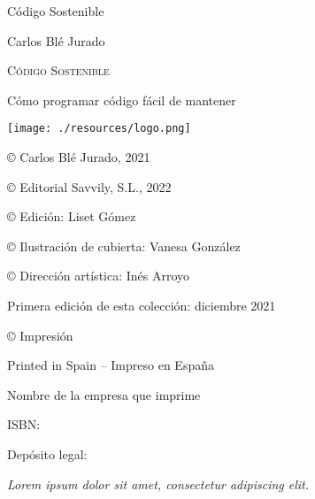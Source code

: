 \documentclass[10pt]{article}
\begin{document}
\newpage\phantom{blabla}\thispagestyle{empty}
\newpage\phantom{blabla}\thispagestyle{empty}
\newpage\phantom{blabla}\thispagestyle{empty}

\begin{titlepage}
  {\large\phantom{blabla} \par}
  \vspace{1cm}
  {\huge\centering Código Sostenible \par}
\end{titlepage}

\newpage\phantom{blabla}\thispagestyle{empty}

\begin{titlepage}\thispagestyle{empty}
  {\large\centering Carlos Blé Jurado \par}
  \vspace{1cm}
  {\scshape\Huge\centering Código Sostenible \par}
  \vspace{0.5cm}
  {\normalsize\centering Cómo programar código fácil de mantener \par}
  \vspace{6.5cm}
  \begin{center}
    {\texttt{[image: ./resources/logo.png]}}
  \end{center}
\end{titlepage}

\begin{titlepage}\thispagestyle{empty}
  \vspace*{\fill}
  {\normalsize © Carlos Blé Jurado, 2021 \par}
  {\normalsize © Editorial Savvily, S.L., 2022 \par}
  {\normalsize © Edición: Liset Gómez \par}
  {\normalsize © Ilustración de cubierta: Vanesa González \par}
  {\normalsize © Dirección artística: Inés Arroyo \par}
  {\normalsize Primera edición de esta colección: diciembre 2021 \par}
  {\normalsize © Impresión \par}
  {\normalsize Printed in Spain – Impreso en España \par}
  {\normalsize Nombre de la empresa que imprime \par}
  {\normalsize ISBN: \par}
  {\normalsize Depósito legal: \par}
\end{titlepage}

\begin{titlepage}\thispagestyle{empty}
  \vspace*{8cm}
  {\itshape\small\raggedleft Lorem ipsum dolor sit amet, consectetur adipiscing elit. \par}
  \restoregeometry
\end{titlepage}

\newpage\phantom{blabla}\thispagestyle{empty}
\end{document}
